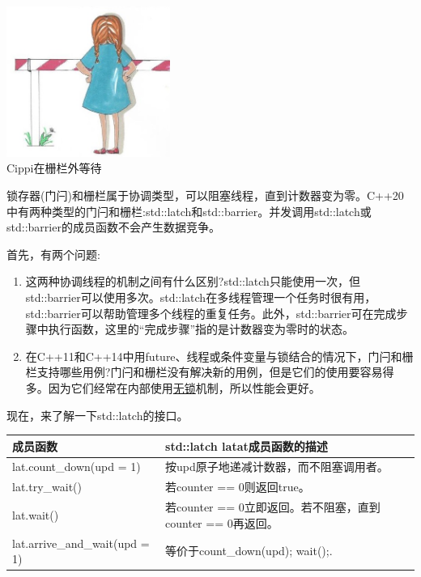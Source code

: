 \begin{center}
\includegraphics[width=0.4\textwidth]{content/3/chapter6/images/18.png}\\
Cippi在栅栏外等待
\end{center}

锁存器(门闩)和栅栏属于协调类型，可以阻塞线程，直到计数器变为零。C++20中有两种类型的门闩和栅栏:std::latch和std::barrier。并发调用std::latch或std::barrier的成员函数不会产生数据竞争。

首先，有两个问题:

\begin{enumerate}
\item 
这两种协调线程的机制之间有什么区别?std::latch只能使用一次，但std::barrier可以使用多次。std::latch在多线程管理一个任务时很有用，std::barrier可以帮助管理多个线程的重复任务。此外，std::barrier可在完成步骤中执行函数，这里的“完成步骤”指的是计数器变为零时的状态。

\item 
在C++11和C++14中用future、线程或条件变量与锁结合的情况下，门闩和栅栏支持哪些用例?门闩和栅栏没有解决新的用例，但是它们的使用要容易得多。因为它们经常在内部使用\href{https://en.wikipedia.org/wiki/Non-blocking_algorithm}{无锁}机制，所以性能会更好。
\end{enumerate}


现在，来了解一下std::latch的接口。

\begin{table}[H]
\centering
\begin{tabular}{ll}
\textbf{成员函数} & \textbf{std::latch latat成员函数的描述}          \\ \hline
lat.count\_down(upd = 1)       & 按upd原子地递减计数器，而不阻塞调用者。  \\
lat.try\_wait()          & 若counter == 0则返回true。 \\
lat.wait()                     & 若counter == 0立即返回。若不阻塞，直到counter == 0再返回。 \\
lat.arrive\_and\_wait(upd = 1) &等价于count\_down(upd); wait();.                              
\end{tabular}
\end{table}

